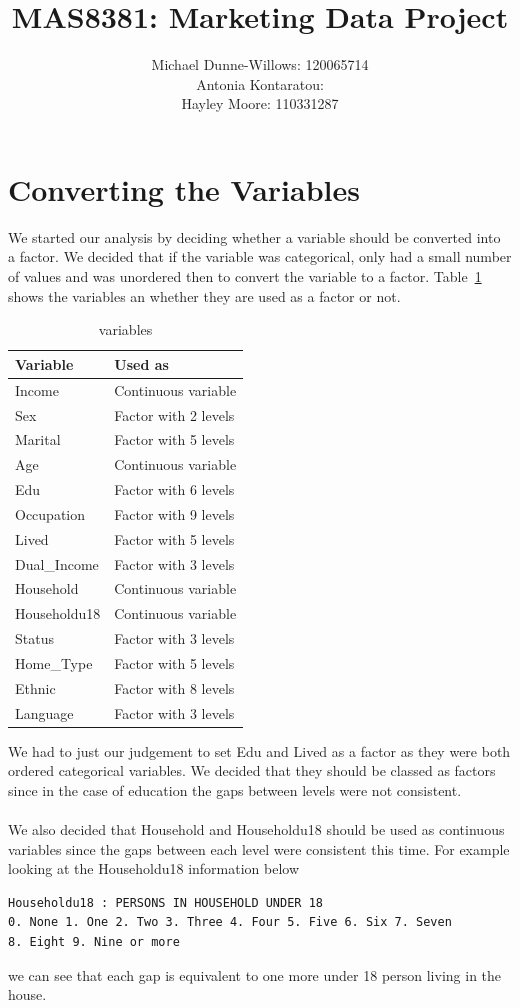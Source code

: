 \documentclass{article}
\begin{document}
\title{MAS8381: Marketing Data Project}
\author{Michael Dunne-Willows: 120065714\\
Antonia Kontaratou:\\
Hayley Moore: 110331287}
\maketitle

\section{Converting the Variables}
We started our analysis by deciding whether a variable should be converted into a factor. We decided that if the variable was categorical, only had a small number of values and was unordered then to convert the variable to a factor. Table~\ref{variables} shows the variables an whether they are used as a factor or not.
\begin{table}[H]
\centering
\begin{tabular}{|l|l|}
\hline
\textbf{Variable} &\textbf{Used as}\\
\hline
Income       &Continuous variable  \\
Sex          &Factor with 2 levels \\
Marital      &Factor with 5 levels \\
Age          &Continuous variable  \\
Edu          &Factor with 6 levels\\
Occupation   &Factor with 9 levels\\
Lived        &Factor with 5 levels\\
Dual\_Income &Factor with 3 levels\\
Household    &Continuous variable  \\
Householdu18 &Continuous variable  \\
Status       &Factor with 3 levels \\
Home\_Type   &Factor with 5 levels \\
Ethnic       &Factor with 8 levels \\
Language     &Factor with 3 levels \\
\hline
\end{tabular}
\caption{variables}
\label{variables}
\end{table}
\noindent We had to just our judgement to set \textsf{Edu} and \textsf{Lived} as a factor as they were both ordered categorical variables. We decided that they should be classed as factors since in the case of education the gaps between levels were not consistent.
\\\\
We also decided that \textsf{Household} and \textsf{Householdu18} should be used as continuous variables since the gaps between each level were consistent this time. For example looking at the \textsf{Householdu18} information below
\begin{verbatim}
Householdu18 : PERSONS IN HOUSEHOLD UNDER 18 
0. None 1. One 2. Two 3. Three 4. Four 5. Five 6. Six 7. Seven 
8. Eight 9. Nine or more
\end{verbatim}
we can see that each gap is equivalent to one more under 18 person living in the house.
\end{document}
